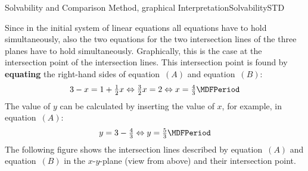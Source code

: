 \begin{MXContent}{Solvability and Comparison Method, graphical Interpretation}{Solvability}{STD}
\begin{MExample}
\begin{center}
{
}%
\end{center}
Since in the initial system of linear equations all equations have to hold simultaneously, 
also the two equations for the two intersection lines of the three planes have to hold 
simultaneously. Graphically, this is the case at the intersection point of the intersection 
lines. This intersection point is found by \textbf{equating} the right-hand sides of 
equation~$(A)$ and equation~$(B)$:
$$3 - x = 1 + \Mtfrac12 x \Leftrightarrow \Mtfrac32 x = 2 \Leftrightarrow x = \Mtfrac43 \MDFPeriod $$
The value of $y$ can be calculated by inserting the value of $x$, for example, 
in equation~$(A)$:
$$y = 3 - \Mtfrac43 \Leftrightarrow y = \Mtfrac53 \MDFPeriod $$
The following figure shows the intersection lines described by equation~$(A)$ and 
equation~$(B)$ in the $x$-$y$-plane (view from above) and their intersection point.



\end{MExample}
\end{MXContent}
